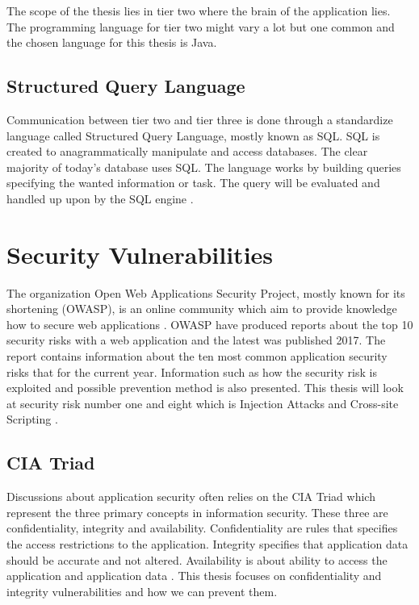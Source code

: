 The scope of the thesis lies in tier two where the brain of the application lies. The programming language for tier two might vary a lot but one common and the chosen language for this thesis is Java.


\subsection{Structured Query Language}
Communication between tier two and tier three is done through a standardize language called Structured Query Language, mostly known as SQL. SQL is created to anagrammatically manipulate and access databases. The clear majority of today's database uses SQL. The language works by building queries specifying the wanted information or task. The query will be evaluated and handled up upon by the SQL engine \parencite{DarieCristian2003TPGt}.


\section{Security Vulnerabilities}
\label{SecurityVulnerabilities}
The organization Open Web Applications Security Project, mostly known for its shortening (OWASP), is an online community which aim to provide knowledge how to secure web applications \parencite{OpenWebApplicationSecurityProject}. OWASP have produced reports about the top 10 security risks with a web application and the latest was published 2017. The report contains information about the ten most common application security risks that for the current year. Information such as how the security risk is exploited and possible prevention method is also presented. This thesis will look at security risk number one and eight which is Injection Attacks and Cross-site Scripting \parencite{OWASP2017}.


\subsection{CIA Triad}
Discussions about application security often relies on the CIA Triad which represent the three primary concepts in information security. These three are confidentiality, integrity and availability. Confidentiality are rules that specifies the access restrictions to the application. Integrity specifies that application data should be accurate and not altered. Availability is about ability to access the application and application data \parencite{2014C1-W}. This thesis focuses on confidentiality and integrity vulnerabilities and how we can prevent them.

